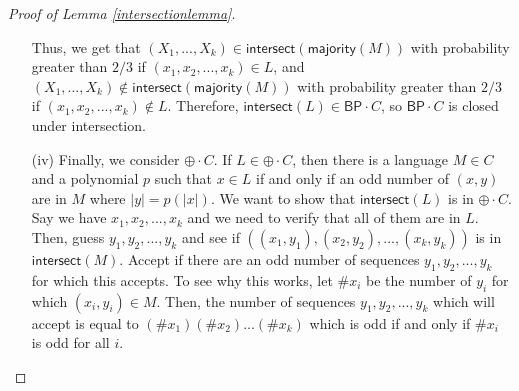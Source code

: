\documentclass[11pt]{article}
\newcommand{\bp}{\textsf{BP}}
\newcommand{\parity}{\oplus}
\newcommand{\intersect}{\textsf{intersect}}
\newcommand{\majority}{\textsf{majority}}
\begin{document}
\begin{proof}[Proof of Lemma \ref{intersectionlemma}]
\begin{enumerate}
Thus, we get that $(X_1,...,X_k)\in\intersect(\majority(M))$ with probability greater than $2/3$ if $(x_1,x_2,...,x_k)\in L$, and $(X_1,...,X_k)\not\in\intersect(\majority(M))$ with probability greater than $2/3$ if $(x_1,x_2,...,x_k)\not\in L$. Therefore, $\intersect(L) \in \bp \cdot C$, so $\bp \cdot C$ is closed under intersection.

\item[(iv)] Finally, we consider $\parity \cdot C$. If $L \in \parity \cdot C$, then there is a language $M \in C$ and a polynomial $p$ such that $x\in L$ if and only if an odd number of $(x,y)$ are in $M$ where $|y| = p(|x|)$. We want to show that $\intersect(L)$ is in $\parity \cdot C$. Say we have $x_1,x_2,...,x_k$ and we need to verify that all of them are in $L$. Then, guess $y_1,y_2,...,y_k$ and see if $((x_1,y_1),(x_2,y_2),...,(x_k,y_k))$ is in $\intersect(M)$. Accept if there are an odd number of sequences $y_1,y_2,...,y_k$ for which this accepts. To see why this works, let $\# x_i$ be the number of $y_i$ for which $(x_i, y_i) \in M$. Then, the number of sequences $y_1,y_2,...,y_k$ which will accept is equal to $(\# x_1)(\# x_2)...(\# x_k)$ which is odd if and only if $\# x_i$ is odd for all $i$.
\end{enumerate}
\end{proof}
\end{document}
